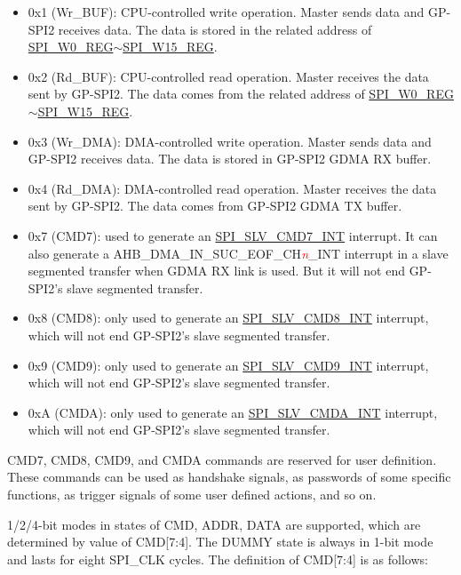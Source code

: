 \documentclass[main\_\_EN.tex]{subfiles}
\begin{document}
\begin{itemize}
    \item \label{cmd:wrbuf} 0x1 (Wr\_BUF): CPU-controlled write operation. Master sends data and GP-SPI2 receives data. The data is stored in the related address of \hyperref[regdesc:SPIW0REG]{SPI\_W0\_REG}$\sim$\hyperref[regdesc:SPIW15REG]{SPI\_W15\_REG}.
    \item \label{cmd:rdbuf} 0x2 (Rd\_BUF): CPU-controlled read operation. Master receives the data sent by GP-SPI2. The data comes from the related address of \hyperref[regdesc:SPIW0REG]{SPI\_W0\_REG}$\sim$\hyperref[regdesc:SPIW15REG]{SPI\_W15\_REG}.
    \item \label{cmd:wrdma} 0x3 (Wr\_DMA): DMA-controlled write operation. Master sends data and GP-SPI2 receives data. The data is stored in GP-SPI2 GDMA RX buffer.
    \item \label{cmd:rddma} 0x4 (Rd\_DMA): DMA-controlled read operation. Master receives the data sent by GP-SPI2. The data comes from GP-SPI2 GDMA TX buffer.
    \item \label{cmd:CMD7} 0x7 (CMD7): used to generate an \hyperref[int:SPISLVCMD7INT]{SPI\_SLV\_CMD7\_INT} interrupt. It can also generate a AHB\_DMA\_IN\_SUC\_EOF\_CH\textcolor{red}{\it{n}}\_INT interrupt in a slave segmented transfer when GDMA RX link is used. But it will not end GP-SPI2’s slave segmented transfer.
    \item 0x8 (CMD8): only used to generate an \hyperref[int:SPISLVCMD8INT]{SPI\_SLV\_CMD8\_INT} interrupt, which will not end GP-SPI2’s slave segmented transfer.
    \item 0x9 (CMD9): only used to generate an \hyperref[int:SPISLVCMD9INT]{SPI\_SLV\_CMD9\_INT} interrupt, which will not end GP-SPI2’s slave segmented transfer.
    \item 0xA (CMDA): only used to generate an \hyperref[int:SPISLVCMDAINT]{SPI\_SLV\_CMDA\_INT} interrupt, which will not end GP-SPI2’s slave segmented transfer. 
\end{itemize}

CMD7, CMD8, CMD9, and CMDA commands are reserved for user definition. These commands can be used as handshake signals, as passwords of some specific functions, as trigger signals of some user defined actions, and so on.

1/2/4-bit modes in states of CMD, ADDR, DATA are supported, which are determined by value of CMD[7:4]. The DUMMY state is always in 1-bit mode and lasts for eight SPI\_CLK cycles. The definition of CMD[7:4] is as follows:
\end{document}
